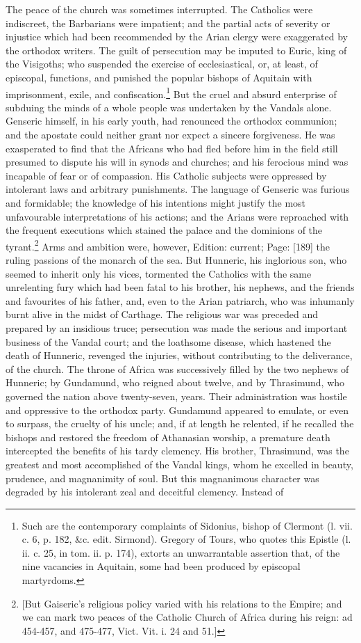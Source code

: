 The peace of the church was sometimes interrupted. The Catholics were indiscreet, the Barbarians were impatient; and the partial acts of severity or injustice which had been recommended by the Arian clergy were exaggerated by the orthodox writers. The guilt of persecution may be imputed to Euric, king of the Visigoths; who suspended the exercise of ecclesiastical, or, at least, of episcopal, functions, and punished the popular bishops of Aquitain with imprisonment, exile, and confiscation.\footnote{Such are the contemporary complaints of Sidonius, bishop of Clermont (l. vii. c. 6, p. 182, \&c. edit. Sirmond). Gregory of Tours, who quotes this Epistle (l. ii. c. 25, in tom. ii. p. 174), extorts an unwarrantable assertion that, of the nine vacancies in Aquitain, some had been produced by episcopal martyrdoms.} But the cruel and absurd enterprise of subduing the minds of a whole people was undertaken by the Vandals alone. Genseric himself, in his early youth, had renounced the orthodox communion; and the apostate could neither grant nor expect a sincere forgiveness. He was exasperated to find that the Africans who had fled before him in the field still presumed to dispute his will in synods and churches; and his ferocious mind was incapable of fear or of compassion. His Catholic subjects were oppressed by intolerant laws and arbitrary punishments. The language of Genseric was furious and formidable; the knowledge of his intentions might justify the most unfavourable interpretations of his actions; and the Arians were reproached with the frequent executions which stained the palace and the dominions of the tyrant.\footnote{[But Gaiseric\texthebrew{}’s religious policy varied with his relations to the Empire; and we can mark two peaces of the Catholic Church of Africa during his reign: ad 454-457, and 475-477, Vict. Vit. i. 24 and 51.]} Arms and ambition were, however, Edition: current; Page: [189] the ruling passions of the monarch of the sea. But Hunneric, his inglorious son, who seemed to inherit only his vices, tormented the Catholics with the same unrelenting fury which had been fatal to his brother, his nephews, and the friends and favourites of his father, and, even to the Arian patriarch, who was inhumanly burnt alive in the midst of Carthage. The religious war was preceded and prepared by an insidious truce; persecution was made the serious and important business of the Vandal court; and the loathsome disease, which hastened the death of Hunneric, revenged the injuries, without contributing to the deliverance, of the church. The throne of Africa was successively filled by the two nephews of Hunneric; by Gundamund, who reigned about twelve, and by Thrasimund, who governed the nation above twenty-seven, years. Their administration was hostile and oppressive to the orthodox party. Gundamund appeared to emulate, or even to surpass, the cruelty of his uncle; and, if at length he relented, if he recalled the bishops and restored the freedom of Athanasian worship, a premature death intercepted the benefits of his tardy clemency. His brother, Thrasimund, was the greatest and most accomplished of the Vandal kings, whom he excelled in beauty, prudence, and magnanimity of soul. But this magnanimous character was degraded by his intolerant zeal and deceitful clemency. Instead of 